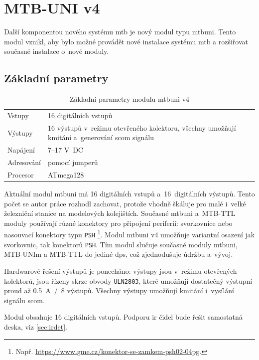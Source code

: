 \newpage
\section{MTB-UNI v4}

Další komponentou nového systému \gls{mtb} je nový modul typu \gls{mtbuni}.
Tento modul vznikl, aby bylo možné provádět nové instalace systému \gls{mtb}
a rozšiřovat současné instalace o~nové moduly.

\subsection{Základní parametry}

\begin{table}[h]
	\begin{tabularx}{\textwidth}{lX}
		\toprule
		Vstupy & 16 digitálních vstupů \\
		Výstupy & 16 výstupů v~režimu otevřeného kolektoru, všechny umožňují
		kmitání a~generování \gls{scom} signálu \\
		Napájení & 7–17 V~DC \\
		Adresování & pomocí jumperů \\
		Procesor & ATmega128 \\
		\bottomrule
	\end{tabularx}
	\caption{Základní parametry modulu \gls{mtbuni} v4}
	\label{tab:mtbuni-params}
\end{table}

Aktuální modul \gls{mtbuni} má 16 digitálních vstupů a~16~digitálních výstupů.
Tento počet se autor práce rozhodl zachovat, protože vhodně škáluje pro malé
i~velké železniční stanice na modelových kolejištích.
Současné \gls{mtbuni} a~MTB-TTL moduly používají různé konektory
pro připojení periferií: svorkovnice nebo nasouvací konektory typu \texttt{PSH}
\footnote{Např. \url{https://www.gme.cz/konektor-se-zamkem-psh02-04pg}.}.
Modul \gls{mtbuni} v4 umožňuje variantní osazení jak svorkovnic, tak konektorů
\texttt{PSH}. Tím modul slučuje současné moduly \gls{mtbuni}, MTB-UNIm a
MTB-TTL do jediné \gls{dps}, což zjednodušuje údržbu a~vývoj.

Hardwarové řešení výstupů je ponecháno: výstupy jsou v~režimu otevřených
kolektorů, jsou řízeny skrze obvody \texttt{ULN2803}, které umožňují
dostatečný výstupní proud až 0.5~A~/~8 výstupů. Všechny výstupy umožňují kmitání
i~vysílání signálu \gls{scom}.

Modul obsahuje 16 digitálních vstupů. Podporu \gls{ir} čidel bude řešit samostatná
deska, viz \ref{sec:irdet}.

